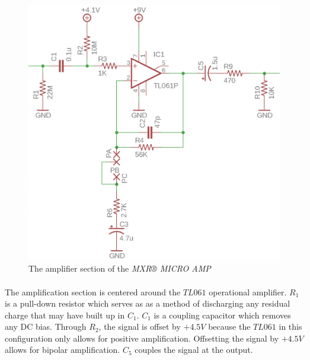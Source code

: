 \documentclass[a4paper, 12pt]{article}
\begin{document}
\begin{figure}[ht]
	\centering
	\includegraphics{img/mxr-amp}
	\caption{The amplifier section of the \textit{MXR® MICRO AMP}}
	\label{fig:mxr-amp}
\end{figure}

\paragraph*{}
The amplification section is centered around the $TL061$ operational 
amplifier. $R_1$ is a pull-down resistor which serves as as a method of 
discharging any residual charge that may have built up in $C_1$. $C_1$ is a 
coupling capacitor which removes any DC bias. Through $R_2$, the signal is 
offset by $+4.5\si{V}$ because the $TL061$ in this configuration only allows 
for positive amplification. Offsetting the signal by $+4.5\si{V}$ allows for 
bipolar amplification. $C_5$ couples the signal at the output.
\end{document}
